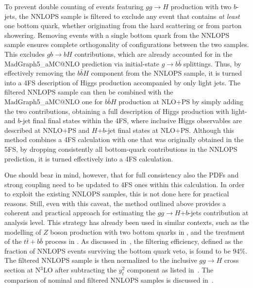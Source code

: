 \documentclass[11pt,a4paper]{article}
\begin{document}
To prevent double counting of events featuring $gg \to H$ production with two $b$-jets, the {\sc NNLOPS} sample is filtered to exclude any event that contains 
{\it at least} one bottom quark, whether originating from the hard scattering or from parton showering. 
Removing events with a single bottom quark from the {\sc NNLOPS} sample ensures complete orthogonality of configurations between the two samples. 
This excludes $g  b \to b H$ contributions, which are already accounted for in the {\sc MadGraph5\_aMC@NLO} prediction via initial-state $g \to b\bar{b}$ splittings. Thus, by effectively removing the $b\bar{b}H$ component from the {\sc NNLOPS} sample, it is turned 
into a 4FS description of Higgs production accompanied by 
only light jets. The filtered {\sc NNLOPS} sample can then be combined with the {\sc MadGraph5\_aMC@NLO} one for 
$b\bar{b}H$ production at NLO+PS by simply adding the two contributions, obtaining a full description of Higgs production with light- and $b$-jet
final final states within the 4FS, where inclusive Higgs observables are described at NNLO+PS and $H$+$b$-jet final states at NLO+PS. 
Although this method combines a 4FS calculation with one that was originally obtained in the 5FS, by dropping consistently all bottom-quark contributions
in the NNLOPS prediction, it is turned effectively into a 4FS calculation.

One should bear in mind, however, that for full consistency also the PDFs and strong
coupling need to be updated to 4FS ones within this calculation. In order to exploit the existing NNLOPS samples, this is not done here for practical reasons.
Still, even with this caveat, the method outlined above provides a coherent and practical approach for estimating the $gg \to H$+$b$-jets contribution at analysis level. 
This strategy has already been used in similar contexts, such as the modelling of $Z$ boson production with two bottom quarks in , and the treatment of the $t\bar{t}+b\bar{b}$ process in .  
As discussed in~\citere{}, the filtering efficiency, defined as the fraction of {\sc NNLOPS} events surviving the bottom quark veto, is found to be 94\%. The filtered {\sc NNLOPS} sample is then normalized to the inclusive $gg \to H$ cross section at N$^3$LO after subtracting the $y_t^2$ \bbH{} component as listed in~. The comparison of nominal and filtered {\sc NNLOPS} samples is discussed in~.
\end{document}
